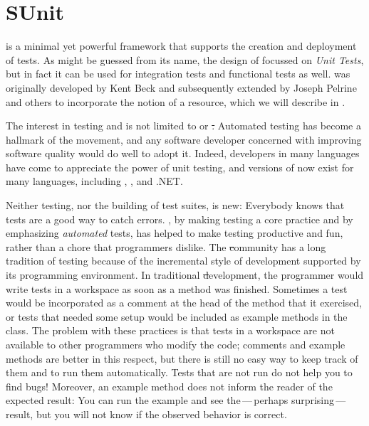 \documentclass[a4paper,10pt,twoside]{book}
\begin{document}
	\renewcommand{\nnbb}[2]{} %
\fi
\chapter{SUnit}
\label{cha:SUnit}


 is a minimal yet powerful framework that supports the creation and deployment of tests.
As might be guessed from its name, the design of \sunit focussed on \emph{Unit Tests},
but in fact it can be used for integration tests and functional tests as well.
\sunit was originally developed by Kent Beck and subsequently extended by Joseph Pelrine and others to incorporate the notion of a resource, which we will describe in .

The interest in testing and  is not limited to \squeak or \st.
Automated testing has become a hallmark of the  movement, and any software developer concerned with improving software quality would do well to adopt it.
Indeed, developers in many languages have come to appreciate the power of unit testing, and versions of \xUnit{} now exist for many languages, including , , and .NET.

Neither testing, nor the building of test suites, is new:
Everybody knows that tests are a good way to catch errors.
\mbox{,} by making testing a core practice and by emphasizing \emph{automated} tests, has helped to make testing productive and fun, rather than a chore that programmers dislike.
The \st community has a long tradition of testing because of the incremental style of development supported by its programming environment.
In traditional \st development, the programmer would write tests in a workspace as soon as a method was finished.
Sometimes a test would be incorporated as a comment at the head of the method that it exercised, or tests that needed some setup would be included as example methods in the class.
The problem with these practices is that tests in a workspace are not available to other programmers who modify the code; comments and example methods are better in this respect, but there is still no easy way to keep track of them and to run them automatically.
Tests that are not run do not help you to find bugs!
Moreover, an example method does not inform the reader of the expected result:
You can run the example and see the\,---\,perhaps surprising\,---\,result, but you will not know if the observed behavior is correct.
\end{document}
